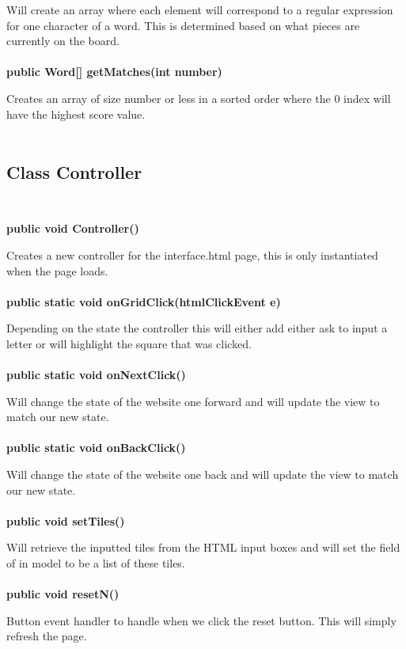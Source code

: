 \documentclass[11pt]{article}
\begin{document}
Will create an array where each element will correspond to a regular expression for one character of a word. This is determined based on what pieces are currently on the board.\\\\
%
\textbf{public Word[] getMatches(int number)\\}

Creates an array of size number or less in a sorted order where the 0 index will have the highest score value.\\\\
%
\subsection{Class Controller \\\\}
%
\textbf{public void Controller()\\}

Creates a new controller for the interface.html page, this is only instantiated when the page loads.\\\\
%
\textbf{public static void onGridClick(htmlClickEvent e)\\}

Depending on the state the controller this will either add either ask to input a letter or will highlight the square that was clicked.\\\\
%
\textbf{public static void onNextClick()\\}

Will change the state of the website one forward and will update the view to match our new state.\\\\
%
\textbf{public static void onBackClick()\\}

Will change the state of the website one back and will update the view to match our new state.\\\\
%
\textbf{public void setTiles()\\}

Will retrieve the inputted tiles from the HTML input boxes and will set the field of in model to be a list of these tiles.\\\\
%
\textbf{public void resetN()\\}

Button event handler to handle when we click the reset button. This will simply refresh the page.\\\\
%
\end{document}

